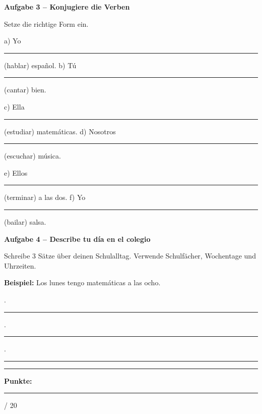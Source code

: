 \documentclass[11pt, a4paper]{article}
\newcommand{\fachfarbe}{spanisch}
\newcommand{\maxpunkte}{20}
\newcommand{\punktebox}[1]{\hfill\fbox{\small \_/#1}}
\newcommand{\luecke}[1]{\rule{#1}{0.4pt}}
\newenvironment{aufgabe}[1]{%
    \needspace{5\baselineskip}%
    \nopagebreak[4]%
    \vspace{10pt}
    \noindent\textbf{\textcolor{\fachfarbe}{Aufgabe #1}}
    \nopagebreak[4]%
    \vspace{5pt}
    \nopagebreak[4]%
    \begin{list}{}{\leftmargin=0pt}
    \item[]
}{%
    \end{list}
}
\begin{document}
\vspace{10pt}


\begin{aufgabe}{3 -- Konjugiere die Verben}
Setze die richtige Form ein. \punktebox{6}
\end{aufgabe}

\noindent
a) Yo \luecke{2.5cm} (hablar) español. \hfill
b) Tú \luecke{2.5cm} (cantar) bien.

\vspace{0.8em}

\noindent
c) Ella \luecke{2.5cm} (estudiar) matemáticas. \hfill
d) Nosotros \luecke{2.5cm} (escuchar) música.

\vspace{0.8em}

\noindent
e) Ellos \luecke{2.5cm} (terminar) a las dos. \hfill
f) Yo \luecke{2.5cm} (bailar) salsa.

\vspace{15pt}


\begin{aufgabe}{4 -- Describe tu día en el colegio}
Schreibe 3 Sätze über deinen Schulalltag. Verwende Schulfächer, Wochentage und Uhrzeiten. \punktebox{6}
\end{aufgabe}

\noindent
\textbf{Beispiel:} Los lunes tengo matemáticas a las ocho.

\vspace{0.8em}

. \luecke{12cm}

\vspace{0.8em}

. \luecke{12cm}

\vspace{0.8em}

. \luecke{12cm}


\vspace{20pt}
\hrule
\vspace{10pt}

\begin{flushright}
\textbf{Punkte:} \luecke{1cm} / \maxpunkte
\end{flushright}
\end{document}
